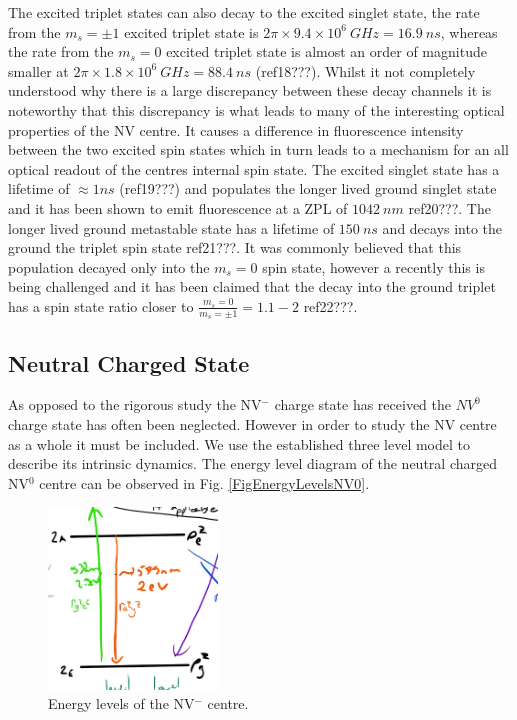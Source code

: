\documentclass[,prl,twocolumn]{revtex4}
\begin{document}
The excited triplet states can also decay to the excited singlet state, the rate from the $m_s=\pm1$ excited triplet state is $2\pi\times9.4\times10^6\SI{}{GHz} = \SI{16.9}{ns}$, whereas the rate from the $m_s=0$ excited triplet state is almost an order of magnitude smaller at $ 2\pi\times1.8\times10^6 \SI{}{GHz} = \SI{88.4}{ns}$ (ref18???). Whilst it not completely understood why there is a large discrepancy between these decay channels it is noteworthy that this discrepancy is what leads to many of the interesting optical properties of the NV centre. It causes a difference in fluorescence intensity between the two excited spin states which in turn leads to a mechanism for an all optical readout of the centres internal spin state. The excited singlet state has a lifetime of $\approx\si{1}{ns}$ (ref19???) and populates the longer lived ground singlet state and it has been shown to emit fluorescence at a ZPL of $\SI{1042}{nm}$ ref20???. The longer lived ground metastable state has a lifetime of $\SI{150}{ns}$ and decays into the ground the triplet spin state ref21???. It was commonly believed that this population decayed only into the $m_s=0$ spin state, however a recently this is being challenged and it has been claimed that the decay into the ground triplet has a spin state ratio closer to $\frac{m_s=0}{m_s=\pm1} = 1.1-2$ ref22???. 

\subsection{Neutral Charged State}
As opposed to the rigorous study the NV$^-$ charge state has received the $NV^0$ charge state has often been neglected. However in order to study the NV centre as a whole it must be included. We use the established three level model to describe its intrinsic dynamics. The energy level diagram of the neutral charged NV$^0$ centre  can be observed in Fig. \ref{FigEnergyLevelsNV0}.

\begin{figure}[H]
  \centering
  \includegraphics[width=0.4\textwidth]{NV0.jpg} 
 \caption{Energy levels of the NV$^-$ centre.} \label{FigEnergyLevelsNV-}
\end{figure}
\end{document}

